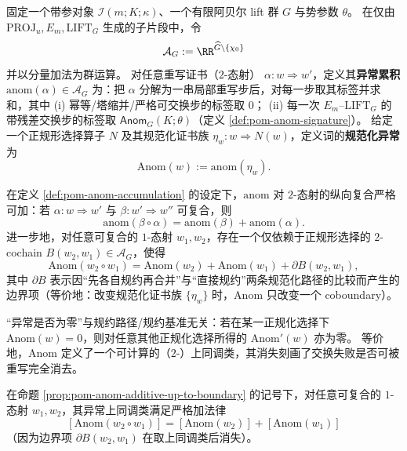 \begin{definition}[异常累积与规范化异常]\label{def:pom-anom-accumulation}
固定一个带参对象 \(\mathcal{I}(m;K;\kappa)\)、一个有限阿贝尔 lift 群 \(G\) 与势参数 \(\theta\)。
在仅由 \(\mathrm{PROJ}_u,E_m,\mathrm{LIFT}_G\) 生成的子片段中，令
\[
\mathcal{A}_G:=\RR^{\widehat G\setminus\{\chi_0\}}
\]
并以分量加法为群运算。
对任意重写证书（\(2\)-态射） \(\alpha:w\Rightarrow w'\)，定义其\textbf{异常累积}
\(\mathrm{anom}(\alpha)\in\mathcal{A}_G\)
为：把 \(\alpha\) 分解为一串局部重写步后，对每一步取其标签并求和，其中
(i) 幂等/塔缩并/严格可交换步的标签取 \(0\)；
(ii) 每一次 \(E_m\)--\(\mathrm{LIFT}_G\) 的带残差交换步的标签取 \(\mathsf{Anom}_G(K;\theta)\)（定义 \ref{def:pom-anom-signature}）。
给定一个正规形选择算子 \(N\) 及其规范化证书族 \(\eta_w:w\Rightarrow N(w)\)，定义词的\textbf{规范化异常}为
\[
\mathrm{Anom}(w):=\mathrm{anom}(\eta_w).
\]
\end{definition}

\begin{proposition}[加法复合律与边界项]\label{prop:pom-anom-additive-up-to-boundary}
在定义 \ref{def:pom-anom-accumulation} 的设定下，\(\mathrm{anom}\) 对 \(2\)-态射的纵向复合严格可加：若 \(\alpha:w\Rightarrow w'\) 与 \(\beta:w'\Rightarrow w''\) 可复合，则
\[
\mathrm{anom}(\beta\circ\alpha)=\mathrm{anom}(\beta)+\mathrm{anom}(\alpha).
\]
进一步地，对任意可复合的 \(1\)-态射 \(w_1,w_2\)，存在一个仅依赖于正规形选择的 \(2\)-cochain \(B(w_2,w_1)\in\mathcal{A}_G\)，使得
\[
\mathrm{Anom}(w_2\circ w_1)
=
\mathrm{Anom}(w_2)+\mathrm{Anom}(w_1)+\partial B(w_2,w_1),
\]
其中 \(\partial B\) 表示因“先各自规约再合并”与“直接规约”两条规范化路径的比较而产生的边界项（等价地：改变规范化证书族 \(\{\eta_w\}\) 时，\(\mathrm{Anom}\) 只改变一个 coboundary）。
\end{proposition}

\begin{corollary}[零异常是路径不变量]\label{cor:pom-anom-cohomology-class}
“异常是否为零”与规约路径/规约基准无关：若在某一正规化选择下 \(\mathrm{Anom}(w)=0\)，则对任意其他正规化选择所得的 \(\mathrm{Anom}'(w)\) 亦为零。
等价地，\(\mathrm{Anom}\) 定义了一个可计算的（\(2\)-）上同调类，其消失刻画了交换失败是否可被重写完全消去。
\end{corollary}

\begin{corollary}\label{cor:pom-anom-class-additive}
在命题 \ref{prop:pom-anom-additive-up-to-boundary} 的记号下，对任意可复合的 \(1\)-态射 \(w_1,w_2\)，其异常上同调类满足严格加法律
\[
\boxed{\;
[\mathrm{Anom}(w_2\circ w_1)]
=
[\mathrm{Anom}(w_2)]
+
[\mathrm{Anom}(w_1)]\;}
\]
（因为边界项 \(\partial B(w_2,w_1)\) 在取上同调类后消失）。
\end{corollary}

